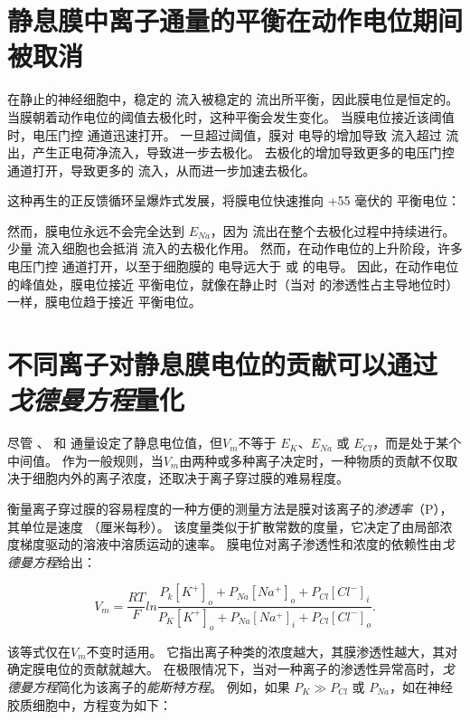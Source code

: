 \section{静息膜中离子通量的平衡在动作电位期间被取消}

在静止的神经细胞中，稳定的  流入被稳定的  流出所平衡，因此膜电位是恒定的。 
当膜朝着动作电位的阈值去极化时，这种平衡会发生变化。 
当膜电位接近该阈值时，电压门控  通道迅速打开。 
一旦超过阈值，膜对  电导的增加导致  流入超过  流出，产生正电荷净流入，导致进一步去极化。 
去极化的增加导致更多的电压门控  通道打开，导致更多的  流入，从而进一步加速去极化。


这种再生的正反馈循环呈爆炸式发展，将膜电位快速推向 +55 毫伏的  平衡电位：



然而，膜电位永远不会完全达到 $E_{Na}$，因为  流出在整个去极化过程中持续进行。 
少量  流入细胞也会抵消  流入的去极化作用。
然而，在动作电位的上升阶段，许多电压门控  通道打开，以至于细胞膜的  电导远大于  或  的电导。 
因此，在动作电位的峰值处，膜电位接近  平衡电位，就像在静止时（当对  的渗透性占主导地位时）一样，膜电位趋于接近  平衡电位。


\section{不同离子对静息膜电位的贡献可以通过\textit{戈德曼方程}量化}
尽管 、 和  通量设定了静息电位值，但$V_m$不等于 $E_K$、$E_{Na}$ 或 $E_{Cl}$，而是处于某个中间值。 
作为一般规则，当$V_m$由两种或多种离子决定时，一种物质的贡献不仅取决于细胞内外的离子浓度，还取决于离子穿过膜的难易程度。


衡量离子穿过膜的容易程度的一种方便的测量方法是膜对该离子的\textit{渗透率}（P），其单位是速度 （厘米每秒）。 
该度量类似于扩散常数的度量，它决定了由局部浓度梯度驱动的溶液中溶质运动的速率。 
膜电位对离子渗透性和浓度的依赖性由\textit{戈德曼方程}给出：

\begin{equation} \label{eq:9_Goldman_Equation}
	V_m = \frac{RT}{F}
		ln \frac{
			P_k [K^+]_o + 
			P_{Na}[Na^+]_o + 
			P_{Cl}[Cl^-]_i
		}
		{
			P_K [K^+]_o + 
			P_{Na}[Na^+]_i + 
			P_{Cl}[Cl^-]_o
		}.
\end{equation}


该等式仅在$V_m$不变时适用。
它指出离子种类的浓度越大，其膜渗透性越大，其对确定膜电位的贡献就越大。
在极限情况下，当对一种离子的渗透性异常高时，\textit{戈德曼方程}简化为该离子的\textit{能斯特方程}。 
例如，如果 $P_K \gg P_{Cl}$ 或 $P_{Na}$，如在神经胶质细胞中，方程变为如下：


